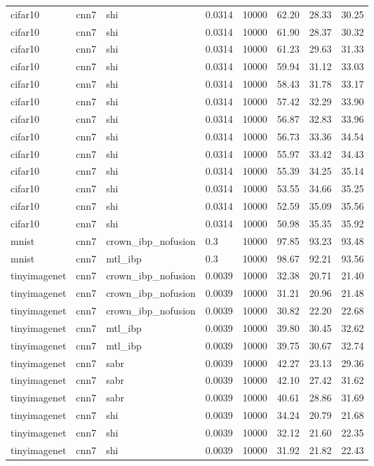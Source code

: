 \begin{tabular}{llllllll}
cifar10 & cnn7 & shi & 0.0314 & 10000 & 62.20 & 28.33 & 30.25 \\
cifar10 & cnn7 & shi & 0.0314 & 10000 & 61.90 & 28.37 & 30.32 \\
cifar10 & cnn7 & shi & 0.0314 & 10000 & 61.23 & 29.63 & 31.33 \\
cifar10 & cnn7 & shi & 0.0314 & 10000 & 59.94 & 31.12 & 33.03 \\
cifar10 & cnn7 & shi & 0.0314 & 10000 & 58.43 & 31.78 & 33.17 \\
cifar10 & cnn7 & shi & 0.0314 & 10000 & 57.42 & 32.29 & 33.90 \\
cifar10 & cnn7 & shi & 0.0314 & 10000 & 56.87 & 32.83 & 33.96 \\
cifar10 & cnn7 & shi & 0.0314 & 10000 & 56.73 & 33.36 & 34.54 \\
cifar10 & cnn7 & shi & 0.0314 & 10000 & 55.97 & 33.42 & 34.43 \\
cifar10 & cnn7 & shi & 0.0314 & 10000 & 55.39 & 34.25 & 35.14 \\
cifar10 & cnn7 & shi & 0.0314 & 10000 & 53.55 & 34.66 & 35.25 \\
cifar10 & cnn7 & shi & 0.0314 & 10000 & 52.59 & 35.09 & 35.56 \\
cifar10 & cnn7 & shi & 0.0314 & 10000 & 50.98 & 35.35 & 35.92 \\
mnist & cnn7 & crown\_ibp\_nofusion & 0.3 & 10000 & 97.85 & 93.23 & 93.48 \\
mnist & cnn7 & mtl\_ibp & 0.3 & 10000 & 98.67 & 92.21 & 93.56 \\
tinyimagenet & cnn7 & crown\_ibp\_nofusion & 0.0039 & 10000 & 32.38 & 20.71 & 21.40 \\
tinyimagenet & cnn7 & crown\_ibp\_nofusion & 0.0039 & 10000 & 31.21 & 20.96 & 21.48 \\
tinyimagenet & cnn7 & crown\_ibp\_nofusion & 0.0039 & 10000 & 30.82 & 22.20 & 22.68 \\
tinyimagenet & cnn7 & mtl\_ibp & 0.0039 & 10000 & 39.80 & 30.45 & 32.62 \\
tinyimagenet & cnn7 & mtl\_ibp & 0.0039 & 10000 & 39.75 & 30.67 & 32.74 \\
tinyimagenet & cnn7 & sabr & 0.0039 & 10000 & 42.27 & 23.13 & 29.36 \\
tinyimagenet & cnn7 & sabr & 0.0039 & 10000 & 42.10 & 27.42 & 31.62 \\
tinyimagenet & cnn7 & sabr & 0.0039 & 10000 & 40.61 & 28.86 & 31.69 \\
tinyimagenet & cnn7 & shi & 0.0039 & 10000 & 34.24 & 20.79 & 21.68 \\
tinyimagenet & cnn7 & shi & 0.0039 & 10000 & 32.12 & 21.60 & 22.35 \\
tinyimagenet & cnn7 & shi & 0.0039 & 10000 & 31.92 & 21.82 & 22.43 \\
\bottomrule
\end{tabular}